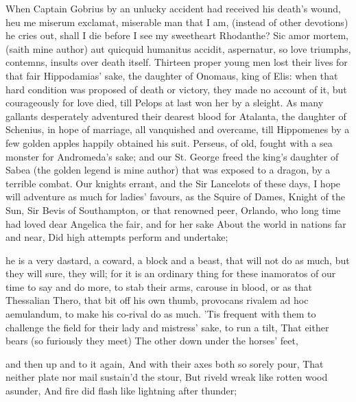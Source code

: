 When Captain Gobrius by an unlucky accident had received his
death's wound, heu me miserum exclamat, miserable man that I am,
(instead of other devotions) he cries out, shall I die before I see my
sweetheart Rhodanthe? Sic amor mortem, (saith mine author) aut quicquid
humanitus accidit, aspernatur, so love triumphs, contemns, insults over
death itself. Thirteen proper young men lost their lives for that fair
Hippodamias' sake, the daughter of Onomaus, king of Elis: when that
hard condition was proposed of death or victory, they made no account
of it, but courageously for love died, till Pelops at last won her by a
sleight. As many gallants desperately adventured their dearest
blood for Atalanta, the daughter of Schenius, in hope of marriage, all
vanquished and overcame, till Hippomenes by a few golden apples happily
obtained his suit. Perseus, of old, fought with a sea monster for
Andromeda's sake; and our St. George freed the king's daughter of Sabea
(the golden legend is mine author) that was exposed to a dragon, by a
terrible combat. Our knights errant, and the Sir Lancelots of these
days, I hope will adventure as much for ladies' favours, as the Squire
of Dames, Knight of the Sun, Sir Bevis of Southampton, or that renowned
peer,
Orlando, who long time had loved dear
Angelica the fair, and for her sake
About the world in nations far and near,
Did high attempts perform and undertake;

he is a very dastard, a coward, a block and a beast, that will not do
as much, but they will sure, they will; for it is an ordinary thing for
these inamoratos of our time to say and do more, to stab their arms,
carouse in blood, or as that Thessalian Thero, that bit off his
own thumb, provocans rivalem ad hoc aemulandum, to make his co-rival do
as much. 'Tis frequent with them to challenge the field for their lady
and mistress' sake, to run a tilt,
That either bears (so furiously they meet)
The other down under the horses' feet,

and then up and to it again,
And with their axes both so sorely pour,
That neither plate nor mail sustain'd the stour,
But riveld wreak like rotten wood asunder,
And fire did flash like lightning after thunder;

